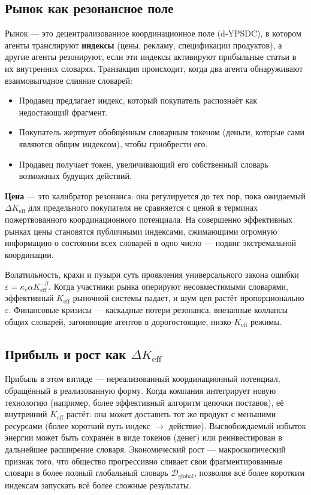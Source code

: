 \documentclass[12pt,a4paper]{article}
\begin{document}
	\subsection{Рынок как резонансное поле}
	
	Рынок — это децентрализованное координационное поле (d‑YPSDC), в котором агенты транслируют \textbf{индексы} (цены, рекламу, спецификации продуктов), а другие агенты резонируют, если эти индексы активируют прибыльные статьи в их внутренних словарях. Транзакция происходит, когда два агента обнаруживают взаимовыгодное слияние словарей:
	\begin{itemize}[leftmargin=*]
		\item Продавец предлагает индекс, который покупатель распознаёт как недостающий фрагмент.
		\item Покупатель жертвует обобщённым словарным токеном (деньги, которые сами являются общим индексом), чтобы приобрести его.
		\item Продавец получает токен, увеличивающий его собственный словарь возможных будущих действий.
	\end{itemize}
	\textbf{Цена} — это калибратор резонанса: она регулируется до тех пор, пока ожидаемый \(\Delta K_{\mathrm{eff}}\) для предельного покупателя не сравняется с ценой в терминах пожертвованного координационного потенциала. На совершенно эффективных рынках цены становятся публичными индексами, сжимающими огромную информацию о состоянии всех словарей в одно число — подвиг экстремальной координации.
	
	Волатильность, крахи и пузыри суть проявления универсального закона ошибки \(\varepsilon = \kappa_c \alpha K_{\mathrm{eff}}^{-\beta}\). Когда участники рынка оперируют несовместимыми словарями, эффективный \(K_{\mathrm{eff}}\) рыночной системы падает, и шум цен растёт пропорционально \(\varepsilon\). Финансовые кризисы — каскадные потери резонанса, внезапные коллапсы общих словарей, загоняющие агентов в дорогостоящие, низко‑\(K_{\mathrm{eff}}\) режимы.
	
	\subsection{Прибыль и рост как \(\Delta K_{\mathrm{eff}}\)}
	
	Прибыль в этом взгляде — нереализованный координационный потенциал, обращённый в реализованную форму. Когда компания интегрирует новую технологию (например, более эффективный алгоритм цепочки поставок), её внутренний \(K_{\mathrm{eff}}\) растёт: она может доставить тот же продукт с меньшими ресурсами (более короткий путь индекс \(\to\) действие). Высвобождаемый избыток энергии может быть сохранён в виде токенов (денег) или реинвестирован в дальнейшее расширение словаря. Экономический рост — макроскопический признак того, что общество прогрессивно сливает свои фрагментированные словари в более полный глобальный словарь \(\mathcal{D}_{\text{global}}\), позволяя всё более коротким индексам запускать всё более сложные результаты.
	
\end{document}

